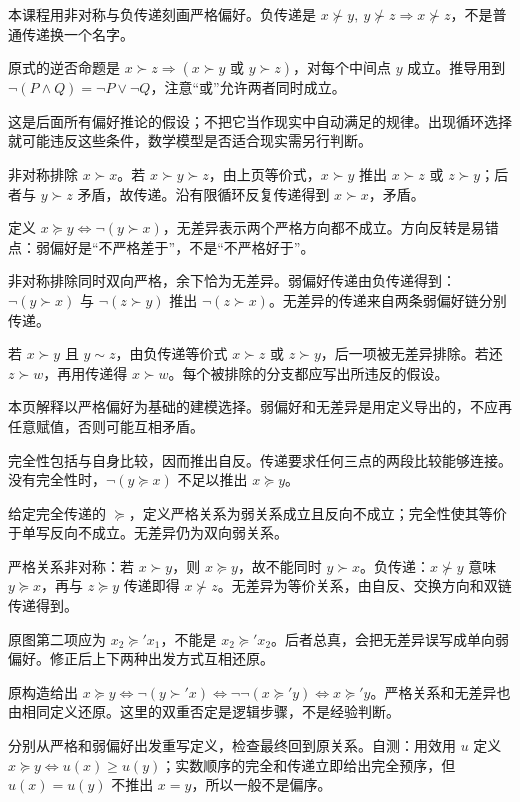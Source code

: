 本课程用非对称与负传递刻画严格偏好。负传递是 $x\not\succ y,\ y\not\succ z\Rightarrow x\not\succ z$，不是普通传递换一个名字。

原式的逆否命题是 $x\succ z\Rightarrow(x\succ y\text{ 或 }y\succ z)$，对每个中间点 $y$ 成立。推导用到 $\neg(P\land Q)=\neg P\lor\neg Q$，注意“或”允许两者同时成立。

这是后面所有偏好推论的假设；不把它当作现实中自动满足的规律。出现循环选择就可能违反这些条件，数学模型是否适合现实需另行判断。

非对称排除 $x\succ x$。若 $x\succ y\succ z$，由上页等价式，$x\succ y$ 推出 $x\succ z$ 或 $z\succ y$；后者与 $y\succ z$ 矛盾，故传递。沿有限循环反复传递得到 $x\succ x$，矛盾。

定义 $x\succeq y\iff\neg(y\succ x)$，无差异表示两个严格方向都不成立。方向反转是易错点：弱偏好是“不严格差于”，不是“不严格好于”。

非对称排除同时双向严格，余下恰为无差异。弱偏好传递由负传递得到：$\neg(y\succ x)$ 与 $\neg(z\succ y)$ 推出 $\neg(z\succ x)$。无差异的传递来自两条弱偏好链分别传递。

若 $x\succ y$ 且 $y\sim z$，由负传递等价式 $x\succ z$ 或 $z\succ y$，后一项被无差异排除。若还 $z\succ w$，再用传递得 $x\succ w$。每个被排除的分支都应写出所违反的假设。

本页解释以严格偏好为基础的建模选择。弱偏好和无差异是用定义导出的，不应再任意赋值，否则可能互相矛盾。

完全性包括与自身比较，因而推出自反。传递要求任何三点的两段比较能够连接。没有完全性时，$\neg(y\succeq x)$ 不足以推出 $x\succeq y$。

给定完全传递的 $\succeq$，定义严格关系为弱关系成立且反向不成立；完全性使其等价于单写反向不成立。无差异仍为双向弱关系。

严格关系非对称：若 $x\succ y$，则 $x\succeq y$，故不能同时 $y\succ x$。负传递：$x\not\succ y$ 意味 $y\succeq x$，再与 $z\succeq y$ 传递即得 $x\not\succ z$。无差异为等价关系，由自反、交换方向和双链传递得到。

原图第二项应为 $x_2\succeq' x_1$，不能是 $x_2\succeq' x_2$。后者总真，会把无差异误写成单向弱偏好。修正后上下两种出发方式互相还原。

原构造给出 $x\succeq y\iff\neg(y\succ' x)\iff\neg\neg(x\succeq' y)\iff x\succeq' y$。严格关系和无差异也由相同定义还原。这里的双重否定是逻辑步骤，不是经验判断。

分别从严格和弱偏好出发重写定义，检查最终回到原关系。自测：用效用 $u$ 定义 $x\succeq y\iff u(x)\ge u(y)$；实数顺序的完全和传递立即给出完全预序，但 $u(x)=u(y)$ 不推出 $x=y$，所以一般不是偏序。
